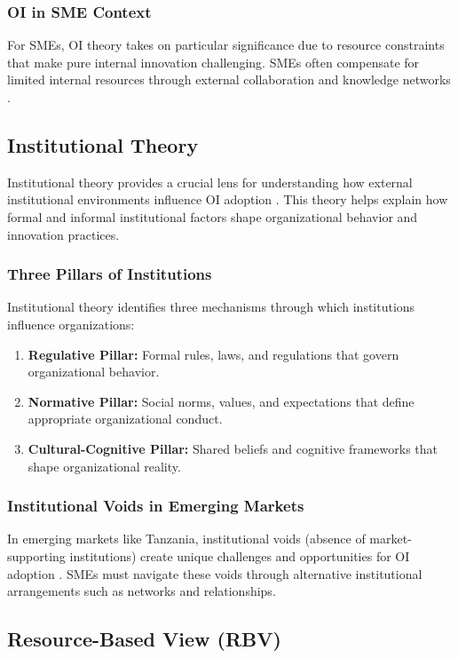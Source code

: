 \subsubsection{OI in SME Context}
For SMEs, OI theory takes on particular significance due to resource constraints that make pure internal innovation challenging. SMEs often compensate for limited internal resources through external collaboration and knowledge networks \citep{van2010open}.

\subsection{Institutional Theory}

Institutional theory provides a crucial lens for understanding how external institutional environments influence OI adoption \citep{scott2008institutions}. This theory helps explain how formal and informal institutional factors shape organizational behavior and innovation practices.

\subsubsection{Three Pillars of Institutions}
Institutional theory identifies three mechanisms through which institutions influence organizations:
\begin{enumerate}
    \item \textbf{Regulative Pillar:} Formal rules, laws, and regulations that govern organizational behavior.
    \item \textbf{Normative Pillar:} Social norms, values, and expectations that define appropriate organizational conduct.
    \item \textbf{Cultural-Cognitive Pillar:} Shared beliefs and cognitive frameworks that shape organizational reality.
\end{enumerate}

\subsubsection{Institutional Voids in Emerging Markets}
In emerging markets like Tanzania, institutional voids (absence of market-supporting institutions) create unique challenges and opportunities for OI adoption \citep{khanna2000business}. SMEs must navigate these voids through alternative institutional arrangements such as networks and relationships.

\subsection{Resource-Based View (RBV)}

